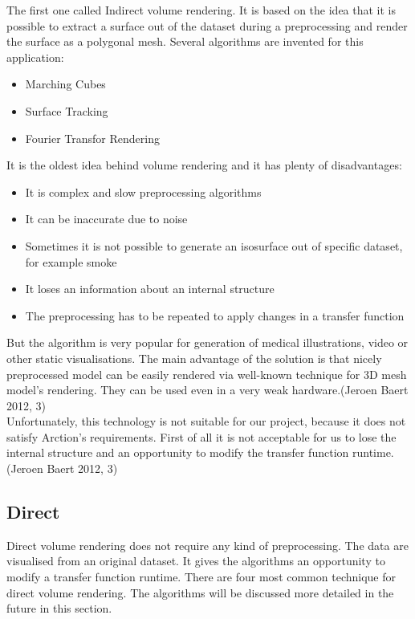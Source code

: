 \documentclass[twoside, english, 11pt]{report}
\begin{document}
The first one called Indirect volume rendering. It is based on the idea that it is possible to extract a surface out of the dataset during a preprocessing and render the surface as a polygonal mesh. Several algorithms are invented for this application:
\begin{itemize}
\item Marching Cubes
\item Surface Tracking
\item Fourier Transfor Rendering
\end{itemize}
It is the oldest idea behind volume rendering and it has plenty of disadvantages:
\begin{itemize}
\item It is complex and slow preprocessing algorithms
\item It can be inaccurate due to noise
\item Sometimes it is not possible to generate an isosurface out of specific dataset, for example smoke
\item It loses an information about an internal structure
\item The preprocessing has to be repeated to apply changes in a transfer function 
\end{itemize}

But the algorithm is very popular for generation of medical illustrations, video or other static visualisations. The main advantage of the solution is that nicely preprocessed model can be easily rendered via well-known technique for 3D mesh model's rendering. They can be used even in a very weak hardware.(Jeroen Baert 2012, 3)\\

Unfortunately, this technology is not suitable for our project, because it does not satisfy Arction's requirements. First of all it is not acceptable for us to lose the internal structure and an opportunity to modify the transfer function runtime.(Jeroen Baert 2012, 3)

\subsection{Direct}
Direct volume rendering does not require any kind of preprocessing. The data are visualised from an original dataset. It gives the algorithms an opportunity to modify a transfer function runtime. There are four most common technique for direct volume rendering. The algorithms will be discussed more detailed in the future in this section.\\
\end{document}
